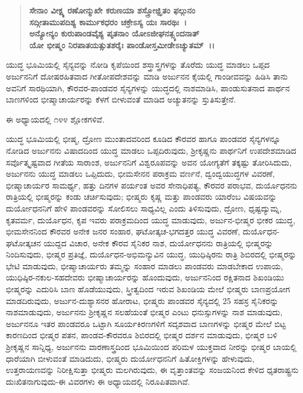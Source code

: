\begin{verse}
\textbf{ಸೇನಾಂ ವೀಕ್ಷ್ಯ ರಣೋನ್ಮುಖೇ ಕರುಣಯಾ ಶಸ್ತ್ರೋಜ್ಝಿತಂ ಫಲ್ಗುನಂ}\\\textbf{ಸದ್ಗೀತಾಮುಪದಿಶ್ಯ ಕಾರ್ಮುಕಧರಂ ಚಕ್ರೇಽಸ್ಯ ಯಃ ಸಾರಥಿಃ~।}\\\textbf{ಅನ್ಯೋನ್ಯಂ ಕುರುಪಾಂಡವೈಶ್ಯ ಪೃತನಾಂ ಯೋಽಜೀಘನತ್ಸ್ಯಂದನಾತ್ }\\\textbf{ಯೋ ಭೀಷ್ಮಂ ನಿರಪಾತಯತ್ಸುತಶರೈಃ ಪಾಂಡೋಸ್ತಮೀಡೇಽಚ್ಯುತಮ್~।।}
\end{verse}

ಯುದ್ಧ ಭೂಮಿಯಲ್ಲಿ ಸೈನ್ಯವನ್ನು ನೋಡಿ ಕೃಪೆಯಿಂದ ಶಸ್ತ್ರಾಸ್ತ್ರಗಳನ್ನು ತೊರೆದು ಯುದ್ಧ ಮಾಡಲು ಒಪ್ಪದ ಅರ್ಜುನನಿಗೆ ದೋಷರಹಿತವಾದ ಗೀತೋಪದೇಶವನ್ನು ಮಾಡಿ ಅರ್ಜುನನ ಕೈಯಲ್ಲಿ ಗಾಂಡೀವವನ್ನು ಹಿಡಿಸಿ ತಾನು ಅವನಿಗೆ ಸಾರಥಿಯಾಗಿ, ಕೌರವರ-\-ಪಾಂಡವರ ಸೈನ್ಯಗಳನ್ನು ಯುದ್ಧದಲ್ಲಿ ನಾಶಮಾಡಿಸಿ, ಪಾಂಡುಸುತನಾದ ಪಾರ್ಥನ ಬಾಣಗಳಿಂದ ಭೀಷ್ಮಾಚಾರ್ಯರನ್ನು ಕೆಳಗೆ ಬೀಳುವಂತೆ ಮಾಡಿದ ಅಚ್ಯುತನನ್ನು ಸ್ತುತಿಸುತ್ತೇನೆ.

ಈ ಅಧ್ಯಾಯದಲ್ಲಿ ೧೪೪ ಶ್ಲೋಕಗಳಿವೆ.

ಯುದ್ಧ ಭೂಮಿಯಲ್ಲಿ ಭೀಷ್ಮ, ದ್ರೋಣ ಮುಂತಾದವರಿಂದ ಕೂಡಿದ ಕೌರವರ ಹಾಗೂ ಪಾಂಡವರ ಸೈನ್ಯಗಳನ್ನೂ ನೋಡಿದ ಅರ್ಜುನನು ವಿಷಾದದಿಂದ ಯುದ್ಧ ಮಾಡಲು ಒಪ್ಪದಿರುವುದು, ಶ‍್ರೀಕೃಷ್ಣನು ಪಾರ್ಥನಿಗೆ ಉಪದೇಶಮಾಡಿದ ಸರ್ವೊತ್ಕೃಷ್ಟವಾದ ಗೀತೆಯ ಸಾರಾಂಶ, ಅರ್ಜುನನಿಗೆ ವಿಶ್ವರೂಪವನ್ನು ಅವನ ಯೋಗ್ಯತೆಗೆ ತಕ್ಕಷ್ಟು ತೋರಿಸಿದುದು, ಅರ್ಜುನನು ಯುದ್ಧ ಮಾಡಲು ಒಪ್ಪಿದುದು, ಭೀಮಸೇನನ ಪರಾಕ್ರಮ ವರ್ಣನೆ, ದ್ವಂದ್ವಯುದ್ಧಗಳ ವಿವರಣೆ, ಭೀಷ್ಮಾಚಾರ್ಯರ ಸಾಮರ್ಥ್ಯ, ಹತ್ತು ದಿನಗಳ ಪರ್ಯಂತ ಅವರ ಸೇನಾಧಿಪತ್ಯ, ಕೌರವರ ಪರಾಭವ, ದುರ್ಯೊಧನನು ರಾತ್ರಿಯಲ್ಲಿ ಭೀಷ್ಮರನ್ನು ಕಂಡು ಚರ್ಚಿಸುವುದು; ಭೀಷ್ಮರು ಕೃಷ್ಣ ಮತ್ತು ಪಾಂಡವರು ಯಾರೆಂಬ ವಿಷಯವನ್ನು ದುರ್ಯೋಧನನಿಗೆ ಹೇಳಿ ಪಾಂಡವರನ್ನು ಸೋಲಿಸಲು ಸಾಧ್ಯವಿಲ್ಲ ಎಂದು ತಿಳಿಸುವುದು, ದ್ರೋಣ, ಧೃಷ್ಟದ್ಯುಮ್ನ, ಕೃತವರ್ಮ, ದುರ್ಯೊಧನ, ಕೃಪ ಇವರು ಪರಾಕ್ರಮದಿಂದ ಯುದ್ಧ ಮಾಡುವುದು, ಅರ್ಜುನ-\-ಭೀಷ್ಮರ ಭೀಕರ ಯುದ್ಧ, ಭೀಮಸೇನನಿಂದ ಕೌರವರ ಅನೇಕ ಜನರ ಸಂಹಾರ, ಘಟೋತ್ಕಚ-\-ಭಗದತ್ತರ ಯುದ್ಧ ವಿವರಣೆ, ದುರ್ಯೊಧನ-ಘಟೋತ್ಕಚನ ಯುದ್ದದ ವಿಚಾರ, ಅನೇಕ ಕೌರವ ಸೈನಿಕರ ನಾಶ, ದುರ್ಯೋಧನನು ರಾತ್ರಿಯಲ್ಲಿ ಭೀಷ್ಮರನ್ನು ನಿಂದಿಸುವುದು, ಭೀಷ್ಮರ ಪ್ರತಿಜ್ಞೆ, ದುರ್ಯೊಧನ-ಅಭಿಮನ್ಯುವಿನ ಯುದ್ಧ, ಯುಧಿಷ್ಠಿರನು ರಾತ್ರಿ ಶಿಬಿರದಲ್ಲಿ ಭೀಷ್ಮರನ್ನು ಭೇಟಿ ಮಾಡುವುದು, ಭೀಷ್ಮಾಚಾರ್ಯರು ತಮ್ಮನ್ನು ಸಂಹಾರ ಮಾಡಲು ಪಾಂಡವರು ಮಾಡಬೇಕಾದ ಉಪಾಯ, ಯುಧಿಷ್ಠಿರ-ನಕುಲ-ಸಹದೇವರು ಭೀಷ್ಮಾಚಾರ್ಯರನ್ನು ಹೊಂದುವುದು, ಅರ್ಜುನನಿಂದ ರಕ್ಷಿತನಾದ ಶಿಖಂಡಿಯು ಭೀಷ್ಮರನ್ನು ಎದುರಿಸಿ ಬಾಣ ಹೊಡೆಯುವುದು, ಸ್ತ್ರೀತ್ವದಿಂದ ಇರುವ ಶಿಖಂಡಿಯ ಮೇಲೆ ಭೀಷ್ಮರು ಬಾಣಪ್ರಯೋಗ ಮಾಡದಿರುವುದು, ಅರ್ಜುನ-ದುಶ್ಯಾಸನರ ಹೋರಾಟ, ಭೀಷ್ಮರು ಪಾಂಡವರ ಸೈನ್ಯದಲ್ಲಿ 25 ಸಹಸ್ರ ಸೈನಿಕರನ್ನು ನಾಶಮಾಡುವುದು, ಅರ್ಜುನನು ಶ‍್ರೀಕೃಷ್ಣನ ಸಲಹೆಯಂತೆ ಭೀಷ್ಮರ ಎಂಟು ಧನುಸ್ಸುಗಳನ್ನು ನಾಶ ಮಾಡುವುದು, ಅರ್ಜುನನೂ ಇತರ ಪಾಂಡವರೂ ಒಟ್ಟಾಗಿ ಸೂರ್ಯಕಿರಣಗಳಿಗೆ ಸದೃಶವಾದ ಬಾಣಗಳನ್ನು ಭೀಷ್ಮರ ಮೇಲೆ ಬಿಟ್ಟ ಕಾರಣದಿಂದ ಭೀಷ್ಮರ ಪತನ, ಪಾಂಡವ-ಕೌರವರೂ ಶಿಬಿರದಲ್ಲಿ ಭೀಷ್ಮರ ದರ್ಶನ ಮಾಡುವುದು, ಭೀಷ್ಮರ ಬಳಿ ಶ‍್ರೀಕೃಷ್ಣನ ಸಾನ್ನಿಧ್ಯ, ಅರ್ಜುನನು ವಾರಣಾಸ್ತ್ರದಿಂದ ಭೂಮಿಯಿಂದ ಪರಿಮಳ ಯುಕ್ತವಾದ ನೀರನ್ನು ಭೀಷ್ಮರ ಬಾಯಲ್ಲಿ ಧಾರೆಯಾಗಿ ಬೀಳುವಂತೆ ಮಾಡಿದುದು, ಭೀಷ್ಮರು ದುರ್ಯೋಧನನಿಗೆ ಹಿತೋಕ್ತಿಗಳನ್ನು ಹೇಳುವುದು, ಉತ್ತರಾಯಣವನ್ನು ನಿರೀಕ್ಷಿಸುತ್ತಾ ಭೀಷ್ಮರು ಮಲಗಿರುವುದು, ಈ ವೃತ್ತಾಂತವನ್ನು ಸಂಜಯನಿಂದ ಕೇಳಿದ ಧೃತರಾಷ್ಟ್ರನು ದುಃಖಿತನಾಗುವುದು-ಈ ವಿವರಗಳು ಈ ಅಧ್ಯಾಯದಲ್ಲಿ ನಿರೂಪಿತವಾಗಿವೆ.

